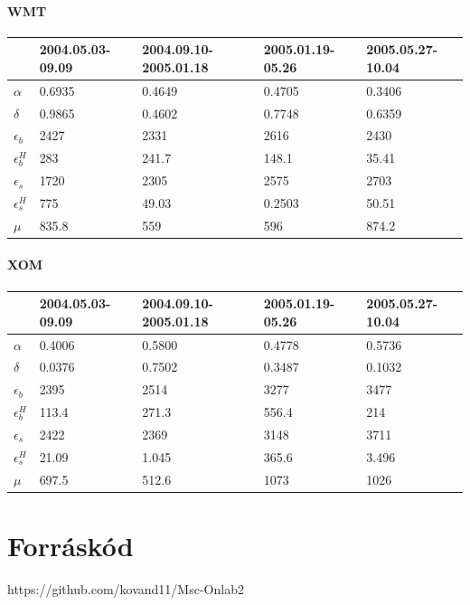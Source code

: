 \documentclass[]{article}
\begin{document}
\paragraph{WMT}

\begin{center}
	\begin{tabular}{| l | l | l | l |l |}
		\hline
		& 2004.05.03-09.09 & 2004.09.10-2005.01.18 & 2005.01.19-05.26 & 2005.05.27-10.04 \\ \hline
		$\alpha$ 	& 0.6935 	& 0.4649 	& 0.4705 	&0.3406\\ \hline
		$\delta$ 	& 0.9865	& 0.4602 	& 0.7748 	&0.6359\\ \hline
		$\epsilon_b$ & 2427 	& 2331 		& 2616 		&2430 \\ \hline
		$\epsilon_b^H$ & 283 	& 241.7 	& 148.1 	&35.41 \\ \hline
		$\epsilon_s$ & 1720 	& 2305		& 2575  	&2703 \\ \hline
		$\epsilon_s^H$ & 775 	& 49.03		& 0.2503 	&50.51 \\ \hline
		$\mu$ 			&835.8 	& 559		& 596		& 874.2\\ \hline
	\end{tabular}
\end{center}

\paragraph{XOM}

\begin{center}
	\begin{tabular}{| l | l | l | l |l |}
		\hline
		& 2004.05.03-09.09 & 2004.09.10-2005.01.18 & 2005.01.19-05.26 & 2005.05.27-10.04 \\ \hline
		$\alpha$ 	& 0.4006 	& 0.5800 	& 0.4778	&0.5736\\ \hline
		$\delta$ 	& 0.0376	& 0.7502 	& 0.3487	&0.1032\\ \hline
		$\epsilon_b$ & 2395		& 2514 		& 3277 		&3477 \\ \hline
		$\epsilon_b^H$ & 113.4 	& 271.3 	& 556.4 	&214 \\ \hline
		$\epsilon_s$ & 2422 	& 2369 		& 3148 		&3711 \\ \hline
		$\epsilon_s^H$ & 21.09 	& 1.045		& 365.6 	&3.496 \\ \hline
		$\mu$ 			&697.5 	& 512.6		& 1073	 	& 1026\\ \hline
	\end{tabular}
\end{center}

\section{Forráskód}

https://github.com/kovand11/Msc-Onlab2
\end{document}
